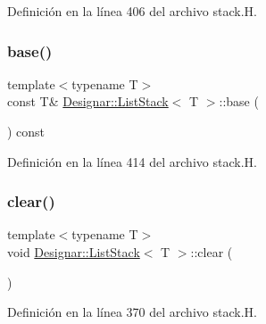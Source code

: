 Definición en la línea 406 del archivo stack.\+H.

\mbox{\label{class_designar_1_1_list_stack_a98ea1c6dff17d53b810e6fedae85340c}} 
\subsubsection{\texorpdfstring{base()}{base()}\hspace{0.1cm}{\footnotesize\ttfamily [2/2]}}
{\footnotesize\ttfamily template$<$typename T$>$ \\
const T\& \hyperlink{class_designar_1_1_list_stack}{Designar\+::\+List\+Stack}$<$ T $>$\+::base (\begin{DoxyParamCaption}{ }\end{DoxyParamCaption}) const\hspace{0.3cm}{\ttfamily [inline]}}



Definición en la línea 414 del archivo stack.\+H.

\mbox{\label{class_designar_1_1_list_stack_aef07f86ff93ad1742207df436ba71aaa}} 
\subsubsection{\texorpdfstring{clear()}{clear()}}
{\footnotesize\ttfamily template$<$typename T$>$ \\
void \hyperlink{class_designar_1_1_list_stack}{Designar\+::\+List\+Stack}$<$ T $>$\+::clear (\begin{DoxyParamCaption}{ }\end{DoxyParamCaption})\hspace{0.3cm}{\ttfamily [inline]}}



Definición en la línea 370 del archivo stack.\+H.

\mbox{\label{class_designar_1_1_list_stack_a78ec42650d4028911a0054f6baaa673a}} 

